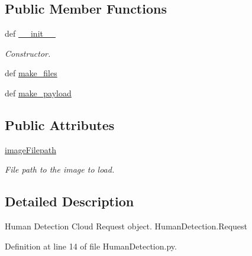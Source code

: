 \subsection*{Public Member Functions}
\begin{DoxyCompactItemize}
\item 
def \hyperlink{classRappCloud_1_1CloudMsgs_1_1HumanDetection_1_1HumanDetection_1_1Request_aeb74f5591cd437efddcfc94198849e1b}{\-\_\-\-\_\-init\-\_\-\-\_\-}
\begin{DoxyCompactList}\small\item\em Constructor. \end{DoxyCompactList}\item 
def \hyperlink{classRappCloud_1_1CloudMsgs_1_1HumanDetection_1_1HumanDetection_1_1Request_a3ca9b0f9e6f6810a8be1792bf3ca2ebd}{make\-\_\-files}
\item 
def \hyperlink{classRappCloud_1_1CloudMsgs_1_1HumanDetection_1_1HumanDetection_1_1Request_aee41812cf95e5b70d0c47ded66c48684}{make\-\_\-payload}
\end{DoxyCompactItemize}
\subsection*{Public Attributes}
\begin{DoxyCompactItemize}
\item 
\hyperlink{classRappCloud_1_1CloudMsgs_1_1HumanDetection_1_1HumanDetection_1_1Request_af1b63325406319b5a28aeb349c527d89}{image\-Filepath}
\begin{DoxyCompactList}\small\item\em File path to the image to load. \end{DoxyCompactList}\end{DoxyCompactItemize}


\subsection{Detailed Description}
\begin{DoxyVerb}Human Detection Cloud Request object. HumanDetection.Request \end{DoxyVerb}
 

Definition at line 14 of file Human\-Detection.\-py.




